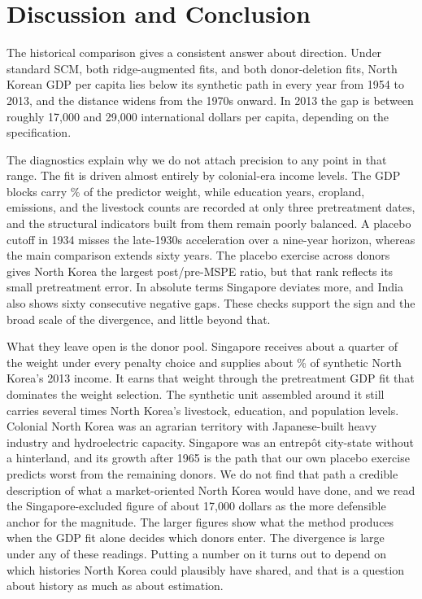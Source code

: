 \documentclass[12pt]{article}
\begin{document}
\FloatBarrier
\section{Discussion and Conclusion}
The historical comparison gives a consistent answer about direction. Under standard SCM, both ridge-augmented fits, and both donor-deletion fits, North Korean GDP per capita lies below its synthetic path in every year from 1954 to 2013, and the distance widens from the 1970s onward. In 2013 the gap is between roughly 17,000 and 29,000 international dollars per capita, depending on the specification.

The diagnostics explain why we do not attach precision to any point in that range. The fit is driven almost entirely by colonial-era income levels. The GDP blocks carry \GDPWeight\% of the predictor weight, while education years, cropland, emissions, and the livestock counts are recorded at only three pretreatment dates, and the structural indicators built from them remain poorly balanced. A placebo cutoff in 1934 misses the late-1930s acceleration over a nine-year horizon, whereas the main comparison extends sixty years. The placebo exercise across donors gives North Korea the largest post/pre-MSPE ratio, but that rank reflects its small pretreatment error. In absolute terms Singapore deviates more, and India also shows sixty consecutive negative gaps. These checks support the sign and the broad scale of the divergence, and little beyond that.

What they leave open is the donor pool. Singapore receives about a quarter of the weight under every penalty choice and supplies about \SingaporeShare\% of synthetic North Korea's 2013 income. It earns that weight through the pretreatment GDP fit that dominates the weight selection. The synthetic unit assembled around it still carries several times North Korea's livestock, education, and population levels. Colonial North Korea was an agrarian territory with Japanese-built heavy industry and hydroelectric capacity. Singapore was an entrep\^ot city-state without a hinterland, and its growth after 1965 is the path that our own placebo exercise predicts worst from the remaining donors. We do not find that path a credible description of what a market-oriented North Korea would have done, and we read the Singapore-excluded figure of about 17,000 dollars as the more defensible anchor for the magnitude. The larger figures show what the method produces when the GDP fit alone decides which donors enter. The divergence is large under any of these readings. Putting a number on it turns out to depend on which histories North Korea could plausibly have shared, and that is a question about history as much as about estimation.
\end{document}
